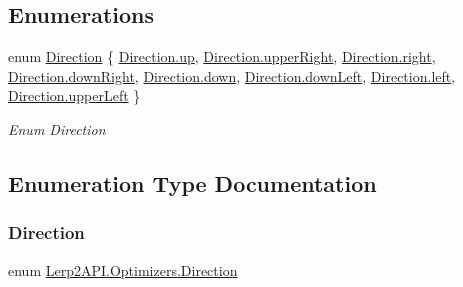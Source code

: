 \subsection*{Enumerations}
\begin{DoxyCompactItemize}
\item 
enum \hyperlink{namespace_lerp2_a_p_i_1_1_optimizers_a159a6f85bec1076b8b34d5da86c7cafe}{Direction} \{ \newline
\hyperlink{namespace_lerp2_a_p_i_1_1_optimizers_a159a6f85bec1076b8b34d5da86c7cafea46c48bec0d282018b9d167eef7711b2c}{Direction.\+up}, 
\hyperlink{namespace_lerp2_a_p_i_1_1_optimizers_a159a6f85bec1076b8b34d5da86c7cafea4580b177e216fadc52ff07db28fe92c0}{Direction.\+upper\+Right}, 
\hyperlink{namespace_lerp2_a_p_i_1_1_optimizers_a159a6f85bec1076b8b34d5da86c7cafea7c4f29407893c334a6cb7a87bf045c0d}{Direction.\+right}, 
\hyperlink{namespace_lerp2_a_p_i_1_1_optimizers_a159a6f85bec1076b8b34d5da86c7cafea10547849e55baa4457b6e2bdfab93f69}{Direction.\+down\+Right}, 
\newline
\hyperlink{namespace_lerp2_a_p_i_1_1_optimizers_a159a6f85bec1076b8b34d5da86c7cafea74e8333ad11685ff3bdae589c8f6e34d}{Direction.\+down}, 
\hyperlink{namespace_lerp2_a_p_i_1_1_optimizers_a159a6f85bec1076b8b34d5da86c7cafea52a58ac62aea51d1543d2738e756d357}{Direction.\+down\+Left}, 
\hyperlink{namespace_lerp2_a_p_i_1_1_optimizers_a159a6f85bec1076b8b34d5da86c7cafea811882fecd5c7618d7099ebbd39ea254}{Direction.\+left}, 
\hyperlink{namespace_lerp2_a_p_i_1_1_optimizers_a159a6f85bec1076b8b34d5da86c7cafea22ccfcf4f0f83b069be2c9971615a6a2}{Direction.\+upper\+Left}
 \}\begin{DoxyCompactList}\small\item\em Enum Direction \end{DoxyCompactList}
\end{DoxyCompactItemize}


\subsection{Enumeration Type Documentation}
\mbox{\label{namespace_lerp2_a_p_i_1_1_optimizers_a159a6f85bec1076b8b34d5da86c7cafe}} 
\subsubsection{\texorpdfstring{Direction}{Direction}}
{\footnotesize\ttfamily enum \hyperlink{namespace_lerp2_a_p_i_1_1_optimizers_a159a6f85bec1076b8b34d5da86c7cafe}{Lerp2\+A\+P\+I.\+Optimizers.\+Direction}\hspace{0.3cm}{\ttfamily [strong]}}



